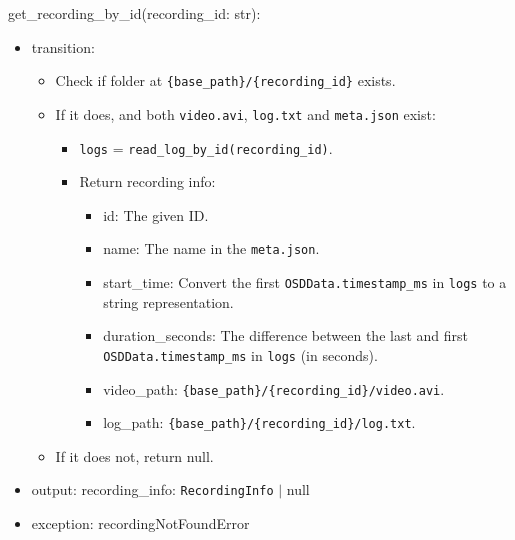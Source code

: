 \documentclass[12pt, titlepage]{article}
\begin{document}
\noindent get\_recording\_by\_id(recording\_id: str):
\begin{itemize}
  \item transition:
        \begin{itemize}
          \item Check if folder at \texttt{\{base\_path\}/\{recording\_id\}} exists.
          \item If it does, and both \texttt{video.avi}, \texttt{log.txt} and
                \texttt{meta.json} exist:
                \begin{itemize}
                  \item \texttt{logs} = \texttt{read\_log\_by\_id(recording\_id)}.
                  \item Return recording info:
                        \begin{itemize}
                          \item id: The given ID.
                          \item name: The name in the \texttt{meta.json}.
                          \item start\_time: Convert the first \texttt{OSDData.timestamp\_ms} in \texttt{logs}
                                to a string representation.
                          \item duration\_seconds: The difference between the last and first
                                \texttt{OSDData.timestamp\_ms} in \texttt{logs} (in seconds).
                          \item video\_path: \texttt{\{base\_path\}/\{recording\_id\}/video.avi}.
                          \item log\_path: \texttt{\{base\_path\}/\{recording\_id\}/log.txt}.
                        \end{itemize}
                \end{itemize}
          \item If it does not, return null.
        \end{itemize}
  \item output: recording\_info: \texttt{RecordingInfo} $|$ null
  \item exception: recordingNotFoundError
\end{itemize}
\end{document}
